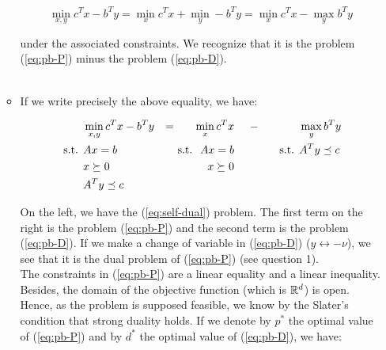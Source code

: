 \documentclass[a4paper, 11pt]{report}
\begin{document}
\begin{enumerate}
\begin{itemize}
    \[ \min_{x, y} c^{T} x - b^{T} y = \min_{x} c^{T} x + \min_{y} - b^{T} y = \min_{x} c^{T} x - \max_{y} b^{T} y \]
    
    under the associated constraints. We recognize that it is the problem (\ref{eq:pb-P}) minus the problem (\ref{eq:pb-D}). \\
    
     \\
    
    \item If we write precisely the above equality, we have:
    
    \begin{equation*}
    \begin{aligned}
                  & \min_{x, y} c^{T} x - b^{T} y   & = &               & \min_{x} c^{T} x  & \hspace{0.5cm} - \hspace{0.2cm} &               & \max_{y} b^{T} y \\
    \text{ s.t. } & Ax = b                          &   & \text{ s.t. }\hspace{-.4cm} & Ax = b            &   & \text{ s.t. } & A^{T}y \preceq c \\
                  & x \succeq 0                     &   &               & x \succeq 0       &   &               &                  \\
                  & A^{T} y \preceq c               &   &               &                   &   &               &
    \end{aligned}
    \end{equation*}
    
    On the left, we have the (\ref{eq:self-dual}) problem. The first term on the right is the problem (\ref{eq:pb-P}) and the second term is the problem (\ref{eq:pb-D}). If we make a change of variable in (\ref{eq:pb-D}) ($y \leftrightarrow - \nu$), we see that it is the dual problem of (\ref{eq:pb-P}) (see question 1). \\
    
    The constraints in (\ref{eq:pb-P}) are a linear equality and a linear inequality. Besides, the domain of the objective function (which is $\mathbb{R}^{d}$) is open. Hence, as the problem is supposed feasible, we know by the Slater's condition that strong duality holds. If we denote by $p^{*}$ the optimal value of (\ref{eq:pb-P}) and by $d^{*}$ the optimal value of (\ref{eq:pb-D}), we have:
    

\end{itemize}
\end{enumerate}
\end{document}
